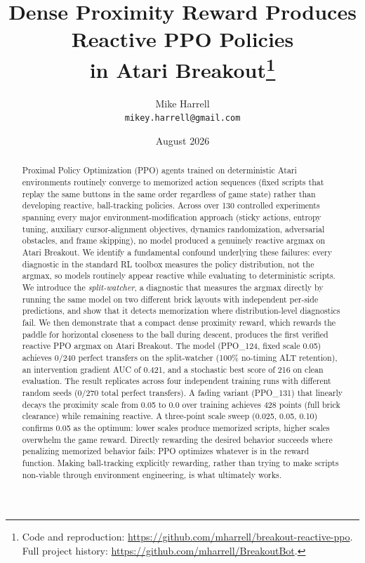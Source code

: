 \documentclass[11pt]{article}
\title{\textbf{Dense Proximity Reward Produces Reactive PPO Policies\\
in Atari Breakout}\thanks{Code and reproduction: \url{https://github.com/mharrell/breakout-reactive-ppo}.
Full project history: \url{https://github.com/mharrell/BreakoutBot}.}}
\author{Mike Harrell\\
\texttt{mikey.harrell@gmail.com}}
\date{August 2026}
\begin{document}
\maketitle

\begin{abstract}
Proximal Policy Optimization (PPO) agents trained on deterministic Atari environments
routinely converge to memorized action sequences (fixed scripts that replay the same
buttons in the same order regardless of game state) rather than developing reactive,
ball-tracking policies. Across over 130 controlled experiments spanning every major
environment-modification approach (sticky actions, entropy tuning, auxiliary
cursor-alignment objectives, dynamics randomization, adversarial obstacles, and frame
skipping), no model produced a genuinely reactive argmax on Atari Breakout.
We identify a fundamental confound underlying these failures: every diagnostic
in the standard RL toolbox measures the policy distribution, not the
argmax, so models routinely appear reactive while evaluating to deterministic scripts.
We introduce the \emph{split-watcher}, a diagnostic that measures the argmax
directly by running the same model on two different brick layouts with
independent per-side predictions, and show that it detects memorization where
distribution-level diagnostics fail. We then demonstrate that a compact dense
proximity reward, which rewards the paddle for horizontal
closeness to the ball during descent, produces the first verified reactive PPO
argmax on Atari Breakout. The model (PPO\_124, fixed scale 0.05) achieves 0/240
perfect transfers on the split-watcher (100\% no-timing ALT retention), an
intervention gradient AUC of 0.421, and a stochastic best score of 216 on clean
evaluation. The result replicates across four independent training runs with
different random seeds (0/270 total perfect transfers). A fading variant
(PPO\_131) that linearly decays the proximity scale from 0.05 to 0.0 over
training achieves 428 points (full brick clearance) while remaining reactive.
A three-point scale sweep (0.025, 0.05, 0.10) confirms 0.05 as the optimum:
lower scales produce memorized scripts, higher scales overwhelm the game reward.
Directly rewarding the desired behavior succeeds where penalizing memorized
behavior fails: PPO optimizes whatever is in the reward function. Making
ball-tracking explicitly rewarding, rather than trying to make scripts non-viable
through environment engineering, is what ultimately works.
\end{abstract}
\end{document}
